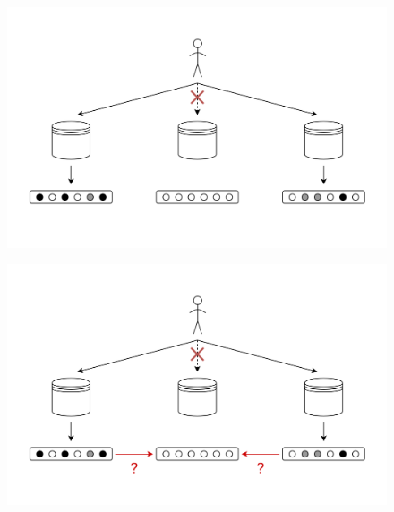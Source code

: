\documentclass[hyperref={pdfpagelabels=false}]{beamer}
\begin{document}
    \begin{frame}
        \begin{figure}[b]
            \centering
            \includegraphics[scale=.26]{idee_reconstruction_collaborative6}
        \end{figure}
    \end{frame}

    \begin{frame}
        \begin{figure}[b]
            \centering
            \includegraphics[scale=.26]{idee_reconstruction_collaborative7}
        \end{figure}
    \end{frame}
\end{document}
